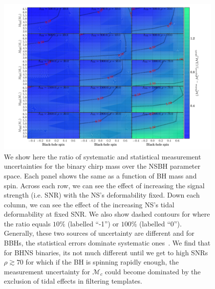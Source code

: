 \documentclass[aps,prd,amsmath,floats,floatfix, twocolumn,
superscriptaddress,nofootinbib,showpacs]{revtex4-1}
\newcommand{\mchirp}{\mathcal{M}_c}
\begin{document}
\begin{figure}
\centering 
\includegraphics[trim={1.3cm 0 0 0},width=2.\columnwidth]{plots/TNMchirpBiasesOverCIWidths_CI90_0_Lambda_SNR30_70_linear}
\caption{We show here the ratio of systematic and statistical
measurement uncertainties for the binary chirp mass over the NSBH parameter 
space. Each panel shows the same as a function of BH mass and spin. Across
each row, we can see the effect of increasing the signal strength (i.e. SNR)
with the NS's deformability fixed. Down each column, we can see 
the effect of the increasing NS's tidal deformability at fixed SNR. We also
show dashed contours for where the ratio equals $10\%$ (labelled ``-1'')
or $100\%$ (labelled ``0'').
% 
Generally, these two sources of uncertainty are different and for BBHs, the
statistical errors dominate systematic ones~\cite{Kumar:2016dhh}. We find
that for BHNS binaries, its not much different until we get to high SNRs
$\rho\gtrsim 70$ for which if the BH is spinning rapidly enough, the 
measurement uncertainty for $\mchirp$ could become dominated by the exclusion
of tidal effects in filtering templates.
}
\label{fig:TN_chirpMassBias_vs_Lambda_SNR}
\end{figure}
%
\end{document}
